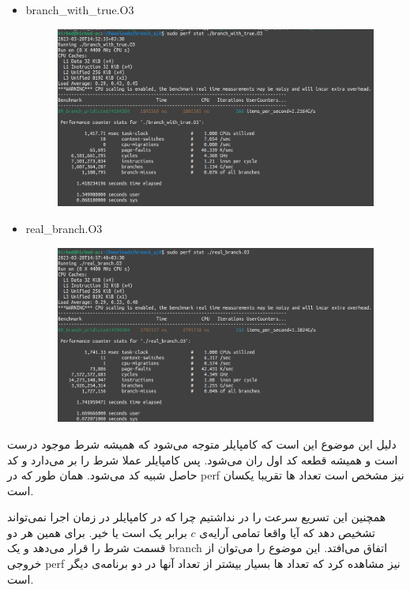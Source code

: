 \begin{enumerate}
\begin{enumerate}
\begin{latin}
\begin{itemize}
            \item branch\_with\_true.O3
            \begin{figure}[H]
                \centerline{\includegraphics[scale=0.35]{pics/5/A/branch_with_true_o3.png}}
            \end{figure}
            \item real\_branch.O3
            \begin{figure}[H]
                \centerline{\includegraphics[scale=0.35]{pics/5/A/real_branch_o3.png}}
            \end{figure}
        \end{itemize}
        \end{latin}
        دلیل این موضوع این است که کامپایلر متوجه می‌شود که همیشه شرط موجود درست است و همیشه
        قطعه کد اول ران می‌شود. پس کامپایلر عملا شرط را بر می‌دارد و کد حاصل شبیه کد
        می‌شود. همان طور که در perf نیز مشخص است تعداد ها تقریبا یکسان است.

        همچنین این تسریع سرعت را در  نداشتیم چرا که در 
        کامپایلر در زمان اجرا نمی‌تواند تشخیص دهد که آیا واقعا تمامی آرایه‌ی $c$
        برابر یک است یا خیر. برای همین هر دو قسمت شرط را قرار می‌دهد و یک branch اتفاق می‌افتد.
        این موضوع را می‌توان از خروجی perf نیز مشاهده کرد که تعداد ها بسیار بیشتر از تعداد
        آنها در دو برنامه‌ی دیگر است.


\end{enumerate}
\end{enumerate}
